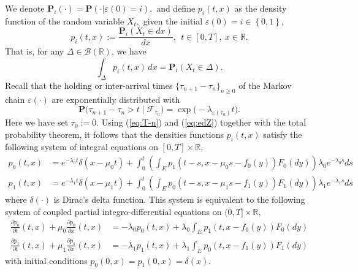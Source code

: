 \documentclass[11pt]{article}
\theoremstyle{plain}
\theoremstyle{definition}
\numberwithin{equation}{section}
\newcommand{\set}[1]{\left\{#1\right\}}
\newcommand{\eps}{\varepsilon}
\newcommand{\R}{\mathds{R}}
\newcommand{\Prob}{\mathbf{P}}
\newcommand{\B}{\mathcal{B}}
\begin{document}
We denote $\Prob_i(\cdot)=\Prob(\cdot|\eps(0)=i),$ and define $p_i(t,x)$ as the density function of the random variable $X_t,$ given the initial $\eps(0)=i\in\set{0,1},$
\begin{equation}
p_i(t,x):=\frac{\Prob_i(X_t\in d x)}{d x}, \ \ t\in[0,T], \ x\in\R.
\end{equation}
That is, for any $\Delta\in\B(\R)$, we have
\[
\int_{\Delta}\! p_{i}(t,x)\,dx=\Prob_i\left(X_t\in \Delta\right).
\]
Recall that the holding or inter-arrival times $\{\tau_{n+1}-\tau_{n}\}_{n\geq0}$ of the Markov chain $\eps(\cdot)$ are exponentially distributed with
\begin{equation}\label{eq:T-n}
\Prob(\tau_{n+1}-\tau_n>t\mid \mathcal{F}_{\tau_n}\bigr)=\exp\bigl(-\lambda_{\eps(\tau_n)}t\bigr).
\end{equation}
Here we have set $\tau_0:=0.$ Using (\ref{eq:T-n}) and (\ref{eq:edZ}) together with the total probability theorem, it follows that the densities functions $p_i(t,x)$ satisfy the following system of integral equations on $[0,T]\times\R,$
\begin{equation*}
\begin{split}
p_0(t,x)&=e^{-\lambda_0t}\delta(x-\mu_0t)+\int_0^t\left(\int_{E} p_{1}(t-s,x-\mu_0s-f_0(y))F_0(d y)\right)\lambda_0e^{-\lambda_0s}ds \\
p_1(t,x)&=e^{-\lambda_1t}\delta(x-\mu_1t)+\int_0^t\left(\int_{E} p_{0}(t-s,x-\mu_1s-f_1(y))F_1(d y)\right)\lambda_1e^{-\lambda_1s}ds
\end{split}
\end{equation*}
where $\delta(\cdot)$ is Dirac's delta function. This system is equivalent to the following system of coupled partial integro-differential equations on $(0,T]\times\R,$
\begin{equation}\label{eq:dX}
\begin{split}
\frac{\partial p_0}{\partial t}(t,x)+\mu_0\frac{\partial p_0}{\partial x}(t,x)&=-\lambda_0p_0(t,x)+\lambda_0\int_{E}p_{1}(t,x-f_0(y))F_0(dy)\\
\frac{\partial p_1}{\partial t}(t,x)+\mu_1\frac{\partial p_1}{\partial x}(t,x)&=-\lambda_1p_1(t,x)+\lambda_1\int_{E}p_{0}(t,x-f_1(y))F_1(dy)
\end{split}
\end{equation}
with initial conditions $p_0(0,x)=p_1(0,x)=\delta(x)$.
\end{document}
